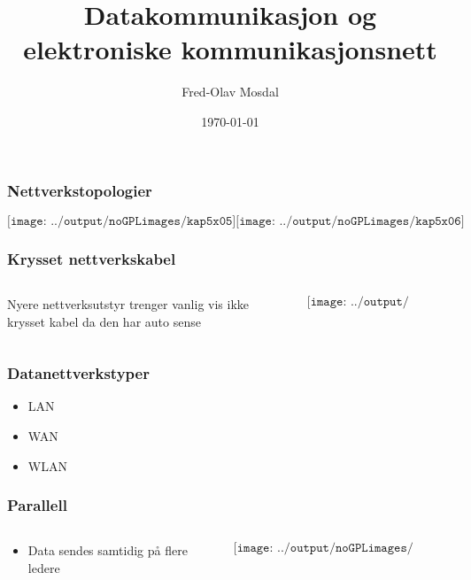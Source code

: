 \documentclass[aspectratio=169,xcolor=dvipsnames]{beamer}
\title[COM]{Datakommunikasjon og elektroniske kommunikasjonsnett} %
\author[Fred-Olav] {Fred-Olav Mosdal}
\institute[Gand VGS] %
{
    Gand VGS \\
    VG3 Automasjon }
\date{\today} %
\begin{document}
\begin{frame}
\titlepage
\end{frame}

\begin{frame}
	\frametitle{Nettverkstopologier}
	$$\texttt{[image: ../output/noGPLimages/kap5x05]}\texttt{[image: ../output/noGPLimages/kap5x06]}$$
\end{frame}
\begin{frame}
	\frametitle{Krysset nettverkskabel}
	\begin{columns}
		\begin{column}{0.5\textwidth}

Nyere nettverksutstyr trenger vanlig vis ikke krysset kabel da den har auto sense
			
		\end{column}

		\begin{column}{0.5\textwidth}
	$$\texttt{[image: ../output/noGPLimages/kap5x07]}$$
		\end{column}
	\end{columns}
\end{frame}
\begin{frame}
	\frametitle{Datanettverkstyper}
	\begin{itemize}
		\item LAN
		\item WAN
		\item WLAN
	\end{itemize}

	
\end{frame}
\begin{frame}
	\frametitle{Parallell}
	\begin{columns}
		\begin{column}{0.5\textwidth}

			\begin{itemize}
				\item Data sendes samtidig på flere ledere
			\end{itemize}

			
		\end{column}

		\begin{column}{0.5\textwidth}
	$$\texttt{[image: ../output/noGPLimages/kap5x10]}$$
		\end{column}
	\end{columns}
\end{frame}
\end{document}
